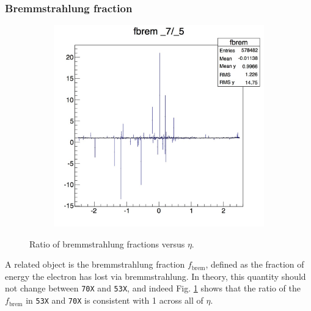 \documentclass[10pt]{article}
\begin{document}
\subsubsection{Bremmstrahlung fraction}
\begin{figure}[h!]
        \centering
        \begin{subfigure}[b]{0.4\textwidth}
                \includegraphics[width=\textwidth]{Plots/fbrem}

             
        \end{subfigure}%

        \caption{Ratio of bremmstrahlung fractions versus $\eta$.}\label{fbremValidation}
\end{figure}
A related object is the bremmstrahlung fraction $f_{\text{brem}}$, defined as the fraction of energy the electron has lost via bremmstrahlung. In theory, this quantity should not change between \texttt{70X} and \texttt{53X}, and indeed Fig. \ref{fbremValidation} shows that the ratio of the $f_{\text{brem}}$ in \texttt{53X} and \texttt{70X} is consistent with 1 across all of $\eta$.
\end{document}
